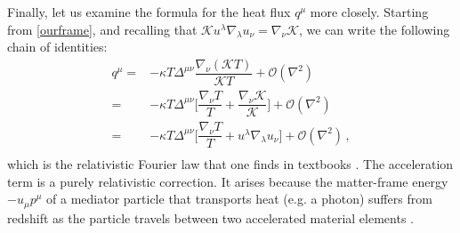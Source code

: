 \documentclass[a4paper, amsfonts, amssymb, amsmath, reprint, showkeys, nofootinbib, twoside, onecolumn,notitlepage]{revtex4-1}
\newcommand{\K}{{\mathcal{K}}}
\theoremstyle{definition}
\theoremstyle{theorem}
\begin{document}
Finally, let us examine the formula for the heat flux $q^\mu$ more closely. Starting from \eqref{ourframe}, and recalling that $\K u^\lambda \nabla_\lambda u_\nu =\nabla_\nu \K$, we can write the following chain of identities:
\begin{equation}\label{heattttone}
\begin{split}
q^\mu ={}& -\kappa T \Delta^{\mu \nu } \dfrac{\nabla_\nu (\K T)}{\K T} +\mathcal{O}(\nabla^2) \\
={}& -\kappa T \Delta^{\mu \nu } \bigg[ \dfrac{\nabla_\nu T}{T} +\dfrac{\nabla_\nu \K}{\K}\bigg] +\mathcal{O}(\nabla^2) \\
={}& -\kappa T \Delta^{\mu \nu }\bigg[ \dfrac{\nabla_\nu T}{T} + u^\lambda \nabla_\lambda u_\nu\bigg] +\mathcal{O}(\nabla^2) \, , \\
\end{split}    
\end{equation}
which is the relativistic Fourier law that one finds in textbooks \cite[Exercise 22.7]{MTW_book}. The acceleration term is a purely relativistic correction. It arises because the matter-frame energy $-u_\mu p^\mu$ of a mediator particle that transports heat (e.g. a photon) suffers from redshift as the particle travels between two accelerated material elements \cite[\S 2.5]{NovikovThorne1973}.








\end{document}
